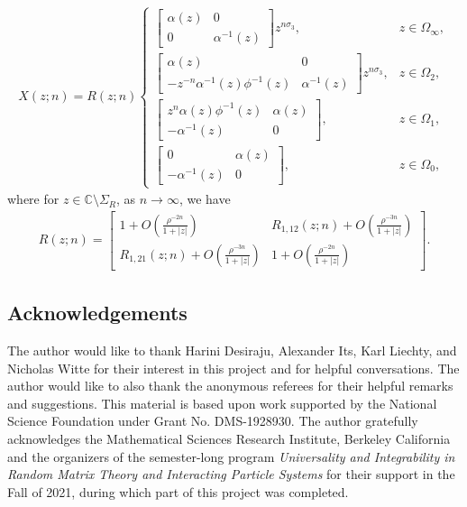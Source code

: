 \documentclass[pdftex]{sigma}
\numberwithin{equation}{section}
\newcommand{\C}{{\mathbb C}}
\newcommand{\al}{\alpha}
\newcommand{\Om}{\Omega}
\newcommand{\di}{\displaystyle}
\begin{document}
		\begin{gather}\label{X in terms of R exact}
			X(z;n) = R(z;n)\begin{cases} \begin{bmatrix} \al(z) & 0 \\ 0 & \al^{-1}(z) \end{bmatrix}z^{n\sigma_3}, & z \in \Om_{\infty}, \\[14pt]
				\begin{bmatrix} \al(z) & 0 \\ -z^{-n}\al^{-1}(z) \phi^{-1}(z) & \al^{-1}(z) \end{bmatrix}z^{n\sigma_3}, & z \in \Om_{2}, \\[14pt]
				\begin{bmatrix} z^{n}\al(z) \phi^{-1}(z) & \al(z) \\ -\al^{-1}(z) & 0 \end{bmatrix}, & z \in \Om_{1}, \\[14pt] \begin{bmatrix} 0 & \al(z) \\ -\al^{-1}(z) & 0 \end{bmatrix}, & z \in \Om_{0},
			\end{cases}
		\end{gather}
		where for $z \in \C \setminus \Sigma_{R}$, as $n \to\infty$, we have
		\begin{gather}\label{R asymp}
			R(z;n)=\di \begin{bmatrix}
				1 + O \left(\frac{ \rho^{-2n}}{ 1+|z| }\right) & R_{1,12}(z;n)+ O \left(\frac{ \rho^{-3n}}{ 1+|z| }\right) \\
				R_{1,21}(z;n)+ O \left(\frac{ \rho^{-3n}}{ 1+|z| }\right) & 1 +O \left(\frac{ \rho^{-2n}}{ 1+|z| }\right)
			\end{bmatrix}.
		\end{gather}

		\subsection*{Acknowledgements}
		The author would like to thank Harini Desiraju, Alexander Its, Karl Liechty, and Nicholas Witte for their interest in this project and for helpful conversations. The author would like to also thank the anonymous referees for their helpful remarks and suggestions. This material is based upon work supported by the National Science Foundation under Grant No. DMS-1928930. The author gratefully acknowledges the Mathematical Sciences Research Institute, Berkeley California and the organizers of the semester-long program \textit{Universality and Integrability in Random Matrix Theory and Interacting Particle Systems} for their support in the Fall of 2021, during which part of this project
		was completed.
\end{document}
